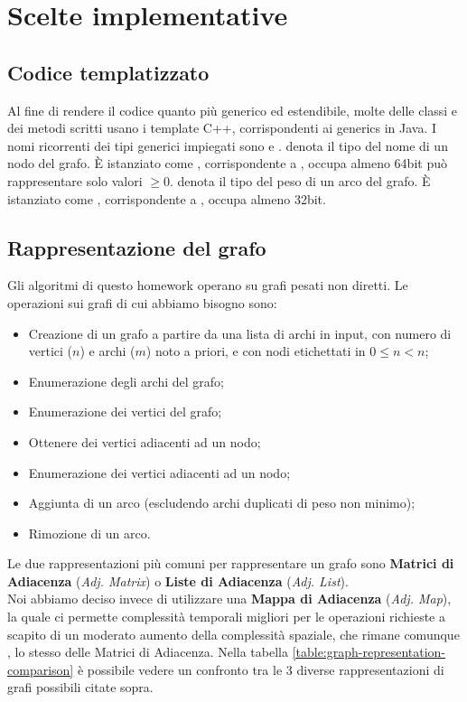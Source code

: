 \section{Scelte implementative}
\label{cap:implementation-choices}

\subsection{Codice templatizzato}

Al fine di rendere il codice quanto più generico ed estendibile, molte delle classi e dei metodi scritti
usano i template C++, corrispondenti ai generics in Java.
I nomi ricorrenti dei tipi generici impiegati sono  e .
 denota il tipo del nome di un nodo del grafo. È istanziato come , corrispondente a , occupa almeno 64bit può rappresentare solo valori $\geq 0$.
 denota il tipo del peso di un arco del grafo. È istanziato come , corrispondente a ,
occupa almeno 32bit.

\subsection{Rappresentazione del grafo}
\label{sub:graph-representation}

Gli algoritmi di questo homework operano su grafi pesati non diretti.
Le operazioni sui grafi di cui abbiamo bisogno sono:

\begin{itemize}
    \item Creazione di un grafo a partire da una lista di archi in input, con numero di vertici ($n$) e archi ($m$) noto a priori, e con nodi etichettati in $ 0 \leq n < n $;
    \item Enumerazione degli archi del grafo;
    \item Enumerazione dei vertici del grafo;
    \item Ottenere dei vertici adiacenti ad un nodo;
    \item Enumerazione dei vertici adiacenti ad un nodo;
    \item Aggiunta di un arco (escludendo archi duplicati di peso non minimo);
    \item Rimozione di un arco.
\end{itemize}

\noindent Le due rappresentazioni più comuni per rappresentare un grafo sono \textbf{Matrici di Adiacenza} (\textit{Adj. Matrix}) o \textbf{Liste di Adiacenza} (\textit{Adj. List}). \\
Noi abbiamo deciso invece di utilizzare una \textbf{Mappa di Adiacenza} (\textit{Adj. Map}), la quale ci permette complessità temporali migliori per le operazioni richieste a scapito di un moderato aumento della complessità spaziale, che rimane comunque \complexityNPlusM{}, lo stesso delle Matrici di Adiacenza. Nella tabella \ref{table:graph-representation-comparison} è possibile vedere un confronto tra le 3 diverse rappresentazioni di grafi possibili citate sopra. \\

